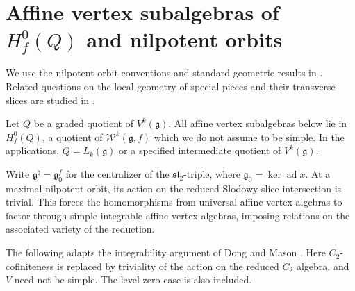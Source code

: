 \documentclass[11pt,a4paper]{amsart}
\numberwithin{equation}{section}
\theoremstyle{definition}
\theoremstyle{remark}
\newcommand{\g}{\mathfrak g}
\begin{document}
\section{Affine vertex subalgebras of \texorpdfstring{$H_f^0(Q)$}{Hf0(Q)} and nilpotent orbits}
\label{com:boundary-current-section}

We use the nilpotent-orbit conventions and standard geometric results in \cite{CollingwoodMcGovern1993}.
Related questions on the local geometry of special pieces and their transverse slices are studied in \cite{FuJuteauLevySommers2023}.

Let $Q$ be a graded quotient of $V^k(\g)$. All affine vertex subalgebras
below lie in $H_f^0(Q)$, a quotient of $\mathcal W^k(\g,f)$ which we
do not assume to be simple. In the applications, $Q=L_k(\g)$ or a
specified intermediate quotient of $V^k(\g)$.

Write $\g^\natural=\g_0^f$ for the centralizer of the
$\mathfrak{sl}_2$-triple, where $\g_0=\ker\operatorname{ad}x$.
At a maximal nilpotent orbit, its action on the reduced Slodowy-slice
intersection is trivial. This forces the homomorphisms from universal
affine vertex algebras to factor through simple integrable affine vertex
algebras, imposing relations on the associated variety of the reduction.

The following adapts the integrability argument of
Dong and Mason \cite[Theorem~3.1]{DongMason2006}.
Here $C_2$-cofiniteness is replaced by triviality of the action on
the reduced $C_2$ algebra, and $V$ need not be simple. The level-zero
case is also included.
\end{document}
